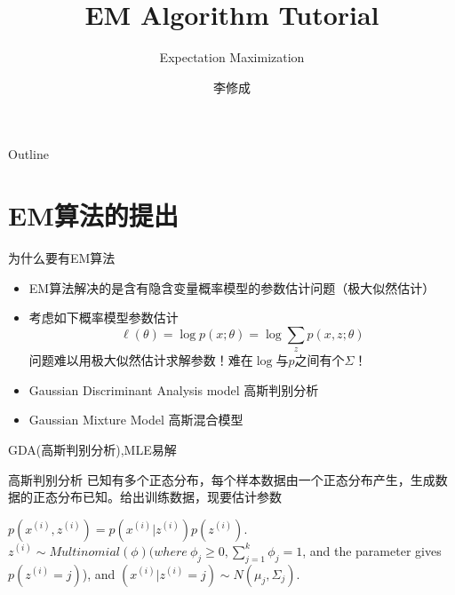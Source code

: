 \documentclass[noindent]{beamer}
\title{EM Algorithm Tutorial}
\subtitle{Expectation Maximization}
\author{李修成}
\institute[HIT]
{
    Department of Computer Science\\
    Harbin Institute of Technology
}
\date{}
\begin{document}
\begin{frame}
  \titlepage
\end{frame}

\begin{frame}{Outline}
  \tableofcontents
\end{frame}

\section{EM算法的提出}
\begin{frame}{为什么要有EM算法}
\begin{itemize}
\item {
        EM算法解决的是含有隐含变量概率模型的参数估计问题（极大似然估计）
}

\item {
 考虑如下概率模型参数估计
\begin{equation}
\ell(\theta)=\log p(x;\theta) = \log  \sum_{z}p(x,z;\theta)
\end{equation}
问题难以用极大似然估计求解参数！难在$\log$与$p$之间有个$\Sigma$！
}
\pause
\item {
  Gaussian Discriminant Analysis model 高斯判别分析
}
\item {
  Gaussian Mixture Model 高斯混合模型
}
\end{itemize}
\end{frame}

\begin{frame}{GDA(高斯判别分析),MLE易解}
\begin{block}{高斯判别分析}
已知有多个正态分布，每个样本数据由一个正态分布产生，生成数据的正态分布已知。给出训练数据，现要估计参数
\end{block}
$p(x^{(i)},z^{(i)}) = p(x^{(i)}|z^{(i)})p(z^{(i)})$.
 $z^{(i)} \sim Multinomial(\phi) (where \ \phi_j \geq 0,
\sum_{j=1}^k \phi_j = 1$, and the parameter gives $p(z^{(i)}=j)$), and $(x^{(i)}|z^{(i)}=j) \sim N(\mu_j,\Sigma_j)$.
\end{frame}
\end{document}
